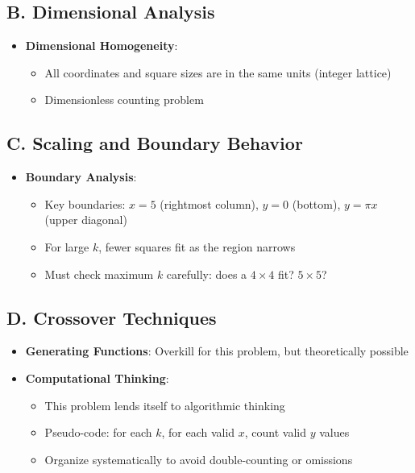 \documentclass[12pt]{article}
\begin{document}
\begin{tacticalbox}
\subsection*{B. Dimensional Analysis}
\begin{itemize}[leftmargin=*]
    \item \textbf{Dimensional Homogeneity}: 
    \begin{itemize}
        \item All coordinates and square sizes are in the same units (integer lattice)
        \item Dimensionless counting problem
    \end{itemize}
\end{itemize}

\subsection*{C. Scaling and Boundary Behavior}
\begin{itemize}[leftmargin=*]
    \item \textbf{Boundary Analysis}: 
    \begin{itemize}
        \item Key boundaries: $x = 5$ (rightmost column), $y = 0$ (bottom), $y = \pi x$ (upper diagonal)
        \item For large $k$, fewer squares fit as the region narrows
        \item Must check maximum $k$ carefully: does a $4 \times 4$ fit? $5 \times 5$?
    \end{itemize}
\end{itemize}

\subsection*{D. Crossover Techniques}
\begin{itemize}[leftmargin=*]
    \item \textbf{Generating Functions}: Overkill for this problem, but theoretically possible
    
    \item \textbf{Computational Thinking}: 
    \begin{itemize}
        \item This problem lends itself to algorithmic thinking
        \item Pseudo-code: for each $k$, for each valid $x$, count valid $y$ values
        \item Organize systematically to avoid double-counting or omissions
    \end{itemize}
\end{itemize}
\end{tacticalbox}
\end{document}
